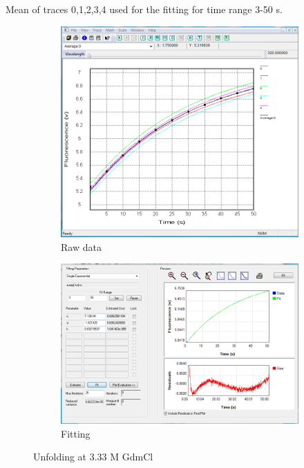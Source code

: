 \documentclass[a4paper,english,12pt,bibliography=totoc]{scrreprt}
\begin{document}
Mean of traces 0,1,2,3,4 used for the fitting for time range 3-50 s.
\begin{figure}[H]
    \centering
    \begin{subfigure}[b]{0.45\textwidth}
        \centering
        \includegraphics[width=\textwidth]{Images/G8/uf3_raw.PNG}
        \caption{Raw data }
        \label{fig:sub1}
    \end{subfigure}
    \hspace{0cm} %
    \begin{subfigure}[b]{0.45\textwidth}
        \centering
        \includegraphics[width=\textwidth]{Images/G8/uf3_fitting.PNG}
        \caption{Fitting}
        \label{fig:sub2}
    \end{subfigure}
    \caption{Unfolding at 3.33 M GdmCl }
    \label{fig:main}
\end{figure}
\end{document}
